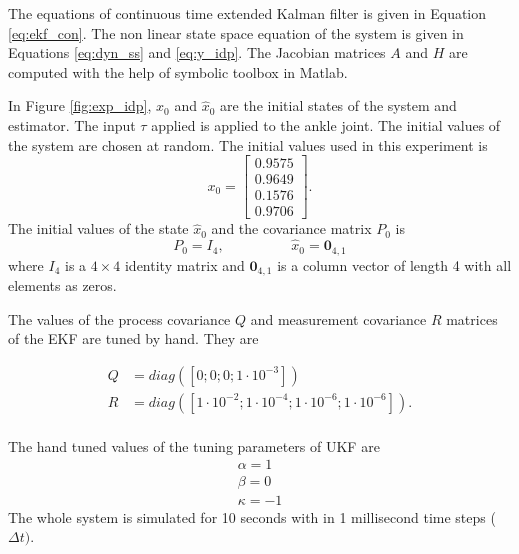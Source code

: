  The equations of continuous time extended Kalman filter is given in Equation \ref{eq:ekf_con}. The non linear state space equation of the system is given in Equations \ref{eq:dyn_ss} and \ref{eq:y_idp}. The Jacobian matrices $A$ and $H$ are computed with the help of symbolic toolbox in Matlab.

In Figure \ref{fig:exp_idp}, $x_0$ and $\hat x_0$ are the initial states of the system and estimator. The input $\tau$ applied is applied to the ankle joint. The initial values of the system are chosen at random. The initial values used in this experiment is 
$$ x_0 = \begin{bmatrix} 0.9575 \\ 0.9649\\ 0.1576\\ 0.9706 \end{bmatrix}.$$  
The initial values of the state $\hat x_0$ and the covariance matrix $P_0$ is $$P_0 = I_4, \hspace{2cm} \hat x_0 = \textbf{0}_{4,1}$$ where $I_4$ is a $4 \times 4$ identity matrix and $\textbf{0}_{4,1}$ is a column vector of length 4 with all elements as zeros.


The values of the  process covariance $Q$ and measurement covariance $R$ matrices of the EKF are tuned by hand. They are 

$$  \begin{aligned}
    Q&=diag([0; 0; 0; 1\cdot{10}^{-3}]) \\
    R&=diag([1\cdot{10}^{-2}; 1\cdot{10}^{-4}; 1\cdot{10}^{-6}; 1\cdot{10}^{-6}]). \\
    \end{aligned}
    $$

The hand tuned values of the tuning parameters of UKF are 
$$  \begin{aligned}
    \alpha = 1 \\
    \beta = 0\\
    \kappa = -1 
    \end{aligned} $$ 
The whole system is simulated for 10 seconds with in 1 millisecond time steps ($\Delta t)$.
